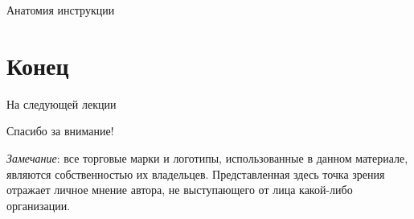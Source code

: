 \begin{frame}{Анатомия инструкции}
\centering
{}
\end{frame}

\section*{Конец}

\begin{frame}{На следующей лекции}
\end{frame}

\begin{frame}

{\huge{Спасибо за внимание!}\par}

\vfill

\tiny{\textit{Замечание}: все торговые марки и логотипы, использованные в данном материале, являются собственностью их владельцев. Представленная здесь точка зрения отражает личное мнение автора, не выступающего от лица какой-либо организации.}

\end{frame}


